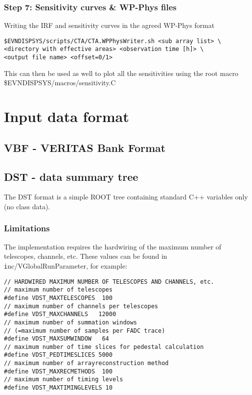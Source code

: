 \documentclass[titlepage,a4paper,twoside,11pt]{report}
\begin{document}
\subsection{Step 7: Sensitivity curves \& WP-Phys files}

Writing the IRF and sensitivity curves in the agreed WP-Phys format

\begin{lstlisting}
$EVNDISPSYS/scripts/CTA/CTA.WPPhysWriter.sh <sub array list> \
<directory with effective areas> <observation time [h]> \
<output file name> <offset=0/1>
\end{lstlisting}

This can then be used as well to plot all the sensitivities using the
root macro \$EVNDISPSYS/macros/sensitivity.C


\chapter{Input data format}

\section{VBF - VERITAS Bank Format}

\section{DST - data summary tree}
\label{SECTION.DST}

The DST format is a simple ROOT tree containing standard C++ variables only (no class data).

\subsection{Limitations}
\label{SUBSECTION.DST.LIMITATIONS}

The implementation requires the hardwiring of the maximum number of telescopes, channels, etc. 
These values can be found in {\texttt inc/VGlobalRunParameter}, for example:

\begin{lstlisting}
// HARDWIRED MAXIMUM NUMBER OF TELESCOPES AND CHANNELS, etc.
// maximum number of telescopes
#define VDST_MAXTELESCOPES  100
// maximum number of channels per telescopes
#define VDST_MAXCHANNELS   12000
// maximum number of summation windows
// (=maximum number of samples per FADC trace)   
#define VDST_MAXSUMWINDOW   64
// maximum number of time slices for pedestal calculation
#define VDST_PEDTIMESLICES 5000   
// maximum number of arrayreconstruction method 
#define VDST_MAXRECMETHODS  100
// maximum number of timing levels
#define VDST_MAXTIMINGLEVELS 10    
\end{lstlisting}
\end{document}
